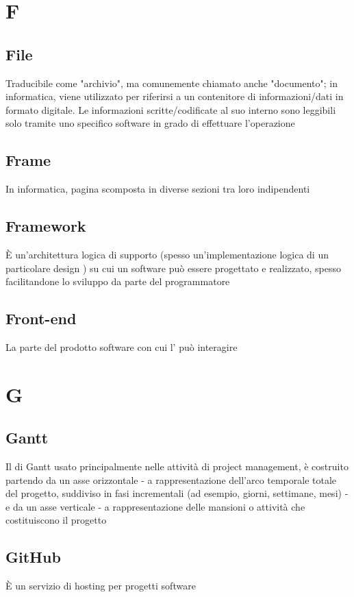 {{%
\section{F}
		\subsection{File}
		Traducibile come "archivio", ma comunemente chiamato anche "documento"; in informatica, viene utilizzato per riferirsi a un contenitore di informazioni/dati in formato digitale. Le informazioni scritte/codificate al suo interno sono leggibili solo tramite uno specifico software in grado di effettuare l'operazione


		\subsection{Frame}
		In informatica, pagina scomposta in diverse sezioni tra loro indipendenti


		 \subsection{Framework}
		 È un'architettura logica di supporto (spesso un'implementazione logica di un particolare design ) su cui un software può essere progettato e realizzato, spesso facilitandone lo sviluppo da parte del programmatore


		 \subsection{Front-end}
		 La parte del prodotto software con cui l' può interagire


\section{G}
		\subsection{Gantt}
		Il  di Gantt usato principalmente nelle attività di project management, è costruito partendo da un asse orizzontale - a rappresentazione dell'arco temporale totale del progetto, suddiviso in fasi incrementali (ad esempio, giorni, settimane, mesi) - e da un asse verticale - a rappresentazione delle mansioni o attività che costituiscono il progetto


		\subsection{GitHub}
		È un servizio di hosting per progetti software


}}
